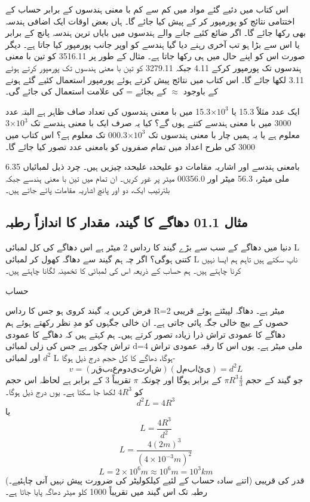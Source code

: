 	اس کتاب میں دئیے گئے مواد میں کم سے کم با معنی ہندسوں کے برابر حساب کے اختتامی نتائج کو پورمپور کر کے پیش کیا جائے گا۔ ہاں بعض اوقات ایک اضافی ہندسہ بھی رکھا جائے گا۔ اگر ضائع کئیے جانے والے ہندسوں میں بایاں ترین ہندسہ پانچ کے برابر یا اس سے بڑا ہو تب آخری رہنے دیا گیا ہندسے کو اوپر جانب پورمپور کیا جاتا ہے۔ دیگر صورت اس کو اپنے حال میں ہی رکھا جاتا ہے۔ مثال کے طور پر 3516.11 کو تین با معنی ہندسوں تک پورمپور کرکے 4.11 جبکہ 3279.11 کو تین با معنی ہندسوں تک پورمپور کرتے ہوئے 3.11 لکھا جائے گا۔ اس کتاب میں نتائج پیش کرتے ہوئے پورمپور استعمال کئیے گئے ہونے کے باوجود $\approx$ کے بجائے = کی علامت استعمال کی جائے گی۔
	
	ایک عدد مثلاً 15.3 یا  $\times 10^{3}$15.3 میں با معنی ہندسوں کی تعداد صاف ظاہر ہے البتہ عدد 3000 میں با معنی ہندسے کتنے ہوں گے؟ کیا یہ صرف ایک با معنی ہندسے تک $\times10^{3}$3 معلوم ہے یا یہ ہمیں چار با معنی ہندسوں تک  $\times 10^{3}$000.3 تک معلوم ہے؟ اس کتاب میں 3000 کی طرح اعداد میں تمام صفروں کو بامعنی عدد تصور کیا جائے گا۔
	
	بامعنی ہندسے اور اشاریہ مقامات دو علیحدہ علیحدہ چیزیں ہیں۔ چرد ذیل لمبائیاں 6.35 ملی میٹر، 56.3 میٹر اور 00356.0 میٹر پر غور کریں۔ ان تمام میں تین با معنی ہندسے جبکہ بلترتیب ایک، دو اور پانچ اشاریہ مقامات پائے جاتے ہیں۔
	\subsection*{مثال 01.1 دھاگے کا گیند، مقدار کا اندازاً رطبہ}
	دنیا میں دھاگے کے سب سے بڑے گیند کا رداس 2 میٹر ہے اس دھاگے کی کل لمبائی L کتنی ہوگی؟ اگر چہ ہم گیند سے دھاگہ کھول کر لمبائی L ناپ سکتے ہیں تاہم ہم ایسا نہیں کرنا چاہتے ہیں۔ ہم حساب کے ذریعہ اس کی لمبائی کا تخمینہ لگانا چاہتے ہیں۔
	
	حساب
	
	فرض کریں یہ گیند کروی ہو جس کا رداس R=2 میٹر ہے۔ دھاگہ لپیٹتے ہوئے قریبی حصوں کے بیچ خالی جگہ پائی جاتی ہے۔ ان خالی جگہوں کو مدِ نظر رکھتے ہوئے ہم دھاگے کا عمودی تراش ذرا زیادہ تصور کرتے ہیں۔ ہم کہتے ہیں کہ دھاگے کا عمودی تراش چکور ہے جس کی زلی لمبائی d=4 ملی میٹر ہے۔ یوں اس کا رقبہ عمودی تراش $d^{2}$ اور لمبائی L ہوگا، دھاگے کا کل حجم درج ذیل ہوگا-
	\[v=(رقبہ عمودی تراش)(لمبائی)=d^{2}L\] 
	جو گیند کے حجم \( \pi R^{3}\frac{4}{3}\) کے برابر ہوگا اور چونکہ $\pi$ تقریباً 3 کے برابر ہے لحاظہ اس حجم کو $4R^{3}$ لکھا جا سکتا ہے۔ یوں درج ذیل ہوگا۔
	\[d^{2}L=4R^{3}\]
	یا
	\[L=\frac{4R^{3}}{d^{2}}\]
	\[L=\frac{4(2m)^3}{(4\times 10^{-3}m)^{2}}\]
	\[L=2\times 10^{6}m\approx 10^{6}m=10^{3}km\]
	(اتنے سادہ حساب کے لئیے کیلکولیٹر کی ضرورت پیش نہیں آنی چاہئیے۔)   قدر  کی قریبی رطبہ تک اس گیند میں تقریباً 1000 کلو میٹر دھاگہ پایا جاتا ہے۔
	
